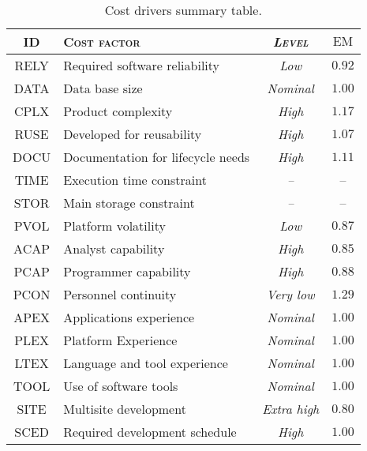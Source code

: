 \begin{table}\begin{tabularx}{\textwidth}{ >{\ttfamily}c X >{\itshape}c c }

\toprule
\normalfont\textsc{ID} & \normalfont\textsc{Cost factor} & \normalfont\textsc{Level} & $ \text{EM} $ \\
\toprule

RELY	& Required software reliability	& Low		& $ 0.92 $ \\ \midrule
DATA	& Data base size					& Nominal	& $ 1.00 $ \\ \midrule
CPLX	& Product complexity				& High		& $ 1.17 $ \\ \midrule
RUSE	& Developed for reusability		& High		& $ 1.07 $ \\ \midrule
DOCU	& Documentation for lifecycle needs		& High		& $ 1.11 $ \\ \midrule

TIME	& Execution time constraint		& --			&    --    \\ \midrule
STOR	& Main storage constraint		& --			&    --    \\ \midrule
PVOL	& Platform volatility			& Low		& $ 0.87 $ \\ \midrule

ACAP	& Analyst capability				& High		& $ 0.85 $ \\ \midrule
PCAP	& Programmer capability			& High		& $ 0.88 $ \\ \midrule
PCON	& Personnel continuity			& Very low	& $ 1.29 $ \\ \midrule
APEX	& Applications experience 		& Nominal	& $ 1.00 $ \\ \midrule
PLEX	& Platform Experience			& Nominal	& $ 1.00 $ \\ \midrule
LTEX	& Language and tool experience	& Nominal	& $ 1.00 $ \\ \midrule

TOOL	& Use of software tools			& Nominal	& $ 1.00 $ \\ \midrule
SITE	& Multisite development			& Extra high	& $ 0.80 $ \\ \midrule
SCED	& Required development schedule	& High		& $ 1.00 $ \\



\bottomrule
	
\end{tabularx}

\caption{Cost drivers summary table.}
\label{tab:cd}


\end{table}


